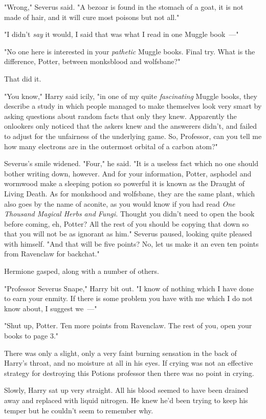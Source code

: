 "Wrong," Severus said. "A bezoar is found in the stomach of a goat, it is not
made of hair, and it will cure most poisons but not all."

"I didn't \emph{say} it would, I said that was what I read in one Muggle
book~---"

"No one here is interested in your \emph{pathetic} Muggle books. Final try.
What is the difference, Potter, between monksblood and wolfsbane?"

That did it.

"You know," Harry said icily, "in one of my quite \emph{fascinating} Muggle
books, they describe a study in which people managed to make themselves look
very smart by asking questions about random facts that only they knew.
Apparently the onlookers only noticed that the askers knew and the answerers
didn't, and failed to adjust for the unfairness of the underlying game. So,
Professor, can you tell me how many electrons are in the outermost orbital of a
carbon atom?"

Severus's smile widened. "Four," he said. "It is a useless fact which no one
should bother writing down, however. And for your information, Potter, asphodel
and wormwood make a sleeping potion so powerful it is known as the Draught of
Living Death. As for monkshood and wolfsbane, they are the same plant, which
also goes by the name of aconite, as you would know if you had read \emph{One
Thousand Magical Herbs and Fungi.} Thought you didn't need to open the book
before coming, eh, Potter? All the rest of you should be copying that down so
that you will not be as ignorant as him." Severus paused, looking quite pleased
with himself. "And that will be{\el} five points? No, let us make it an even
ten points from Ravenclaw for backchat."

Hermione gasped, along with a number of others.

"Professor Severus Snape," Harry bit out. "I know of nothing which I have done
to earn your enmity. If there is some problem you have with me which I do not
know about, I suggest we~---"

"Shut up, Potter. Ten more points from Ravenclaw. The rest of you, open your
books to page 3."

There was only a slight, only a very faint burning sensation in the back of
Harry's throat, and no moisture at all in his eyes. If crying was not an
effective strategy for destroying this Potions professor then there was no
point in crying.

Slowly, Harry sat up very straight. All his blood seemed to have been drained
away and replaced with liquid nitrogen. He knew he'd been trying to keep his
temper but he couldn't seem to remember why.


